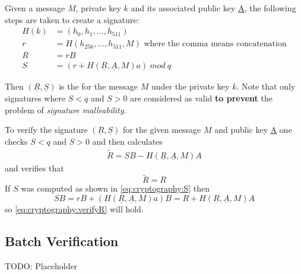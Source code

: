 Given a message $M$, private key $k$ and its associated public key \underline{A}, the following steps are taken to create a signature:
\begin{align}
H(k) &=(h_0, h_1,..., h_{511}) \\
r &= H(h_{256},...,h_{511}, M) \text{ where the comma means concatenation} \\
R &= rB \\
S &= (r + H(\underline{R}, \underline{A}, M)a) \: mod \: q \label{eq:cryptography:S}
\end{align}

Then $(\underline{R}, \underline{S})$ is the  for the message $M$ under the private key $k$.
Note that only signatures where $S<q$ and $S>0$ are considered as valid \textbf{to prevent} the problem of \emph{signature malleability}.

To verify the signature $(\underline{R}, \underline{S})$ for the given message $M$ and public key \underline{A} one checks $S<q$ and $S>0$ and then calculates
\begin{align*}
\tilde{R} = SB - H(\underline{R}, \underline{A}, M)A
\end{align*}
and verifies that
\begin{equation}
\tilde{R} = R \label{eq:cryptography:verifyR}
\end{equation}
If $S$ was computed as shown in \eqref{eq:cryptography:S} then
$$SB = rB + (H(\underline{R}, \underline{A}, M)a)B = R + H(\underline{R}, \underline{A}, M)A$$
so \eqref{eq:cryptography:verifyR} will hold.

\subsection{Batch Verification}

TODO: Placeholder
